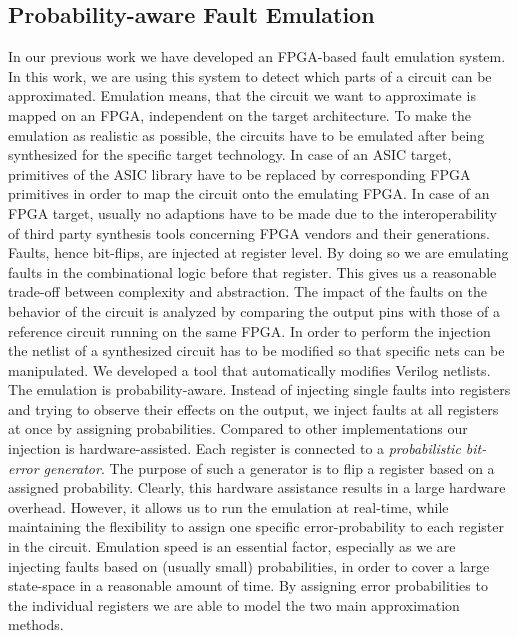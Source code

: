 \documentclass[10pt,twocolumn]{IEEEtran} %
\begin{document}
\subsection{\bf{Probability-aware Fault Emulation}}
In our previous work \cite{may2012fpga} we have developed an FPGA-based fault emulation system. In this work, we are using this system to detect which parts of a circuit can be approximated. Emulation means, that the circuit we want to approximate is mapped on an FPGA, independent on the target architecture. To make the emulation as realistic as possible, the circuits have to be emulated after being synthesized for the specific target technology. In case of an ASIC target, primitives of the ASIC library have to be replaced by corresponding FPGA primitives in order to map the circuit onto the emulating FPGA. In case of an FPGA target, usually no adaptions have to be made due to the interoperability of third party synthesis tools concerning FPGA vendors and their generations. Faults, hence bit-flips, are injected at register level. By doing so we are emulating faults in the combinational logic before that register. This gives us a reasonable trade-off between complexity and abstraction. The impact of the faults on the behavior of the circuit is analyzed by comparing the output pins with those of a reference circuit running on the same FPGA. In order to perform the injection the netlist of a synthesized circuit has to be modified so that specific nets can be manipulated. We developed a tool that automatically modifies Verilog netlists. The emulation is probability-aware. Instead of injecting single faults into registers and trying to observe their effects on the output, we inject faults at all registers at once by assigning probabilities. Compared to other implementations our injection is hardware-assisted. Each register is connected to a \emph{probabilistic bit-error generator}. The purpose of such a generator is to flip a register based on a assigned probability. Clearly, this hardware assistance results in a large hardware overhead. However, it allows us to run the emulation at real-time, while maintaining the flexibility to assign one specific error-probability to each register in the circuit. Emulation speed is an essential factor, especially as we are injecting faults based on (usually small) probabilities, in order to cover a large state-space in a reasonable amount of time. By assigning error probabilities to the individual registers we are able to model the two main approximation methods.
\end{document}
